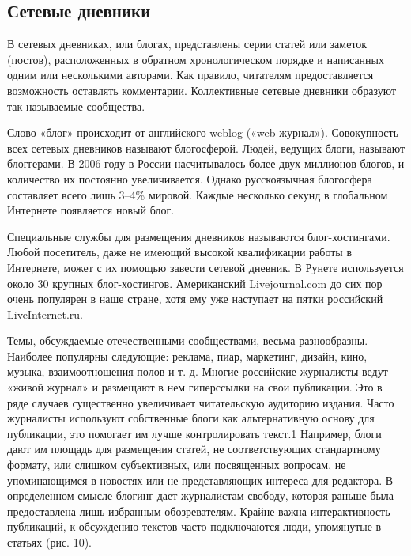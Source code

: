 \documentclass[a4paper,english,russian]{G2-105}
\begin{document}
\subsection{Сетевые дневники}
\par В сетевых дневниках, или блогах, представлены серии статей или заметок (постов), расположенных в обратном хронологическом порядке и написанных одним или несколькими авторами. Как правило, читателям предоставляется возможность оставлять комментарии. Коллективные сетевые дневники образуют так называемые сообщества.
\par Слово «блог» происходит от английского weblog («web-журнал»). Совокупность всех сетевых дневников называют блогосферой. Людей, ведущих блоги, называют блоггерами. В 2006 году в России насчитывалось более двух миллионов блогов, и количество их постоянно увеличивается. Однако русскоязычная блогосфера составляет всего лишь 3–4\%  мировой. Каждые несколько секунд в глобальном Интернете появляется новый блог.
\par Специальные службы для размещения дневников называются блог-хостингами. Любой посетитель, даже не имеющий высокой квалификации работы в Интернете, может с их помощью завести сетевой дневник. В Рунете используется около 30 крупных блог-хостингов. Американский Livejournal.com до сих пор очень популярен в наше стране, хотя ему уже наступает на пятки российский LiveInternet.ru.
\par Темы, обсуждаемые отечественными сообществами, весьма разнообразны. Наиболее популярны следующие: реклама, пиар, маркетинг, дизайн, кино, музыка, взаимоотношения полов и т. д. Многие российские журналисты ведут «живой журнал» и размещают в нем гиперссылки на свои публикации. Это в ряде случаев существенно увеличивает читательскую аудиторию издания. Часто журналисты используют собственные блоги как альтернативную основу для публикации, это помогает им лучше контролировать текст.1 Например, блоги дают им площадь для размещения статей, не соответствующих стандартному формату, или слишком субъективных, или посвященных вопросам, не упоминающимся в новостях или не представляющих интереса для редактора. В определенном смысле блогинг дает журналистам свободу, которая раньше была предоставлена лишь избранным обозревателям. Крайне важна интерактивность публикаций, к обсуждению текстов часто подключаются люди, упомянутые в статьях (рис. 10).
\end{document}

